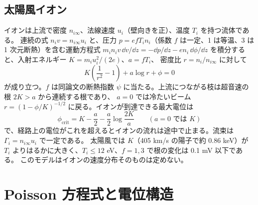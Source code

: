\subsection{太陽風イオン}
イオンは上流で密度 $n_{i\infty}$、法線速度 $u_i$（壁向きを正）、温度 $T_i$ を持つ流体である。
連続の式 $n_iv=n_{i\infty}u_i$ と、圧力 $p=e fT_in_i$（係数 $f$ は一定、1 は等温、3 は 1 次元断熱）を含む運動方程式
$m_in_iv\,\dd v/\dd z=-\dd p/\dd z-en_i\,\dd\phi/\dd z$ を積分すると、入射エネルギー $K=m_iu_i^2/(2e)$、$a=fT_i$、
密度比 $r=n_i/n_{i\infty}$ に対して
\begin{equation}
 K\left(\frac1{r^2}-1\right)+a\log r+\phi=0
 \label{eq:ion_fluid}
\end{equation}
が成り立つ\citep{SanaMishra2026}。$f$ は同論文の断熱指数 $\psi$ に当たる。上流につながる枝は超音速の根 $2K>a$ から連続する根であり、
$a=0$ では冷たいビーム $r=(1-\phi/K)^{-1/2}$ に戻る。イオンが到達できる最大電位は
\begin{equation}
 \phi_{\mathrm{crit}}=K-\frac a2-\frac a2\log\frac{2K}{a}\qquad(a=0\text{ では }K)
 \label{eq:sm_ion_crit}
\end{equation}
で、経路上の電位がこれを超えるとイオンの流れは途中で止まる。流束は $\Gamma_i=n_{i\infty}u_i$ で一定である。
太陽風では $K$（405 km/s の陽子で約 0.86 keV）が $T_i$ よりはるかに大きく、$T_i\le12$ eV、$f=1,3$ で根の変化は 0.1 mV 以下である。
このモデルはイオンの速度分布そのものは定めない。

\section{Poisson 方程式と電位構造}
\label{sec:sm_poisson}

